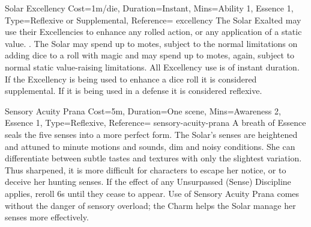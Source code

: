 

\begin{Charm}{Solar Excellency}{
    Cost=1m/die,
    Duration=Instant,
    Mins={Ability 1, Essence 1},
    Type=Reflexive or Supplemental,
    Reference=\cite*[p.~255]{ex3}
}{excellency}
    The Solar Exalted may use their Excellencies to enhance any rolled action,
    or any application of a static value. . The
    Solar may spend up to  motes, subject
    to the normal limitations on adding dice to a roll with magic
    \parencite*[p.~251]{ex3}  and may spend up to  motes, again, subject
    to normal static value-raising limitations. All Excellency use is of
    instant duration. If the Excellency is being used to enhance a dice roll it
    is considered supplemental. If it is being used in a defense it is
    considered reflexive.
\end{Charm}




\begin{Charm}{Sensory Acuity Prana}{
    Cost=5m,
    Duration=One scene,
    Mins={Awareness 2, Essence 1},
    Type=Reflexive,
    Reference=\cite*[p.~267]{ex3}
}{sensory-acuity-prana}
    A breath of Essence seals the five senses into a more perfect form. The
    Solar’s senses are heightened and attuned to minute motions and sounds, dim
    and noisy conditions. She can differentiate between subtle tastes and
    textures with only the slightest variation. Thus sharpened, it is more
    difficult for characters to escape her notice, or to deceive her hunting
    senses.  If the effect of any Unsurpassed (Sense)
    Discipline applies, reroll 6s until they cease to appear. Use of Sensory
    Acuity Prana comes without the danger of sensory overload; the Charm helps
    the Solar manage her senses more effectively.
\end{Charm}

